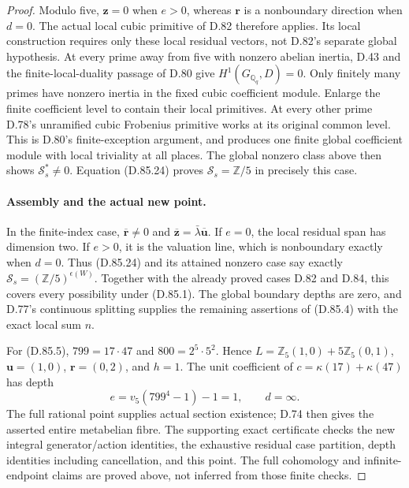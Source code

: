 \begin{proof}
Modulo five, \(\mathbf z=0\) when \(e>0\), whereas
\(\mathbf r\) is a nonboundary direction when \(d=0\).
The actual local cubic primitive of D.82 therefore applies.
Its local construction requires only these local residual
vectors, not D.82's separate global hypothesis.
At every prime away from five with nonzero abelian inertia,
D.43 and the finite-local-duality passage of D.80 give
\(H^1(G_{\mathbb Q_q},D)=0\). Only finitely many primes
have nonzero inertia in the fixed cubic coefficient module.
Enlarge the finite coefficient level to contain their local
primitives. At every other prime D.78's unramified cubic
Frobenius primitive works at its original common level.
This is D.80's finite-exception argument, and produces one
finite global coefficient module with local triviality at
all places. The global nonzero class above then shows
\(\mathcal S_s^*\ne0\). Equation (D.85.24) proves
\(\mathcal S_s=\mathbb Z/5\) in precisely this case.

\paragraph{Assembly and the actual new point.}
In the finite-index case, \(\overline{\mathbf r}\ne0\)
and \(\overline{\mathbf z}=\bar\lambda\overline{\mathbf u}\).
If \(e=0\), the local residual span has dimension two.
If \(e>0\), it is the valuation line, which is nonboundary
exactly when \(d=0\). Thus (D.85.24) and its attained
nonzero case say exactly \(\mathcal S_s=(\mathbb Z/5)^{\epsilon(W)}\).
Together with the already proved cases D.82 and D.84, this
covers every possibility under (D.85.1). The global boundary
depths are zero, and D.77's continuous splitting supplies
the remaining assertions of (D.85.4) with the exact local
sum \(n\).

For (D.85.5), \(799=17\cdot47\) and
\(800=2^5\cdot5^2\). Hence
\(L=\mathbb Z_5(1,0)+5\mathbb Z_5(0,1)\),
\(\mathbf u=(1,0)\), \(\mathbf r=(0,2)\), and \(h=1\).
The unit coefficient of \(c=\kappa(17)+\kappa(47)\)
has depth
\[
 e=v_5(799^4-1)-1=1,
 \qquad d=\infty.
                                                               \tag{D.85.26}
\]
The full rational point supplies actual section existence;
D.74 then gives the asserted entire metabelian fibre.
The supporting exact certificate
 checks the new integral
generator/action identities, the exhaustive residual case
partition, depth identities including cancellation, and
this point. The full cohomology and infinite-endpoint
claims are proved above, not inferred from those finite checks.
\end{proof}
